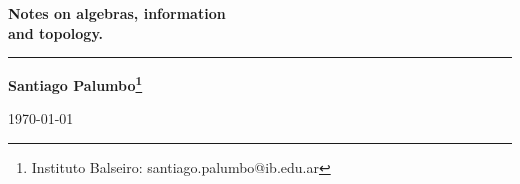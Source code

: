 \documentclass[11pt,oneside]{book}
\begin{document}
\begin{titlepage}

    \raggedright
    
    \vspace*{3cm}
    
    {\Huge\bfseries\sffamily
    Notes on algebras, information\\ and topology.
    \par}
    
    
    
    \rule{\textwidth}{1pt}
    
    \vspace{1.5cm}

    \raggedleft
    {\Large
    \bfseries\sffamily Santiago Palumbo\footnote{\large Instituto Balseiro:  santiago.palumbo@ib.edu.ar}
    \par}
    
    
    \vfill
    
    
    
    \vspace{0.5cm}
  
    {\large
    \today
    \par}
    
    \vspace*{2cm}

\end{titlepage}


\tableofcontents

\clearpage

\clearpage
{}








\end{document}
